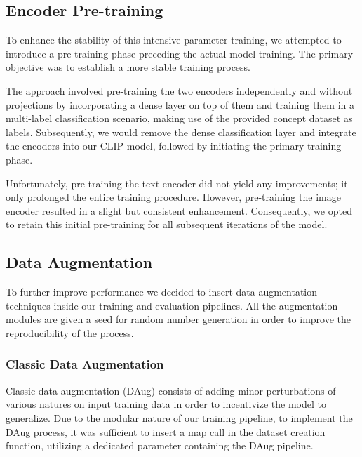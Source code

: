\documentclass[10pt,twocolumn,letterpaper]{article}
\begin{document}
\subsection{Encoder Pre-training}
To enhance the stability of this intensive parameter training, we attempted to introduce a pre-training phase preceding the actual model training. The primary objective was to establish a more stable training process.

The approach involved pre-training the two encoders independently and without projections by incorporating a dense layer on top of them and training them in a multi-label classification scenario, making use of the provided concept dataset as labels. Subsequently, we would remove the dense classification layer and integrate the encoders into our CLIP model, followed by initiating the primary training phase.

Unfortunately, pre-training the text encoder did not yield any improvements; it only prolonged the entire training procedure. However, pre-training the image encoder resulted in a slight but consistent enhancement. Consequently, we opted to retain this initial pre-training for all subsequent iterations of the model.

\subsection{Data Augmentation}
To further improve performance we decided to insert data augmentation techniques inside our training and evaluation pipelines.
All the augmentation modules are given a seed for random number generation in order to improve the reproducibility of the process.

\subsubsection{Classic Data Augmentation}
Classic data augmentation (DAug) consists of adding minor perturbations of various natures on input training data in order to incentivize the model to generalize.
Due to the modular nature of our training pipeline, to implement the DAug process, it was sufficient to insert a map call in the dataset creation function, utilizing a dedicated parameter containing the DAug pipeline.
\end{document}
